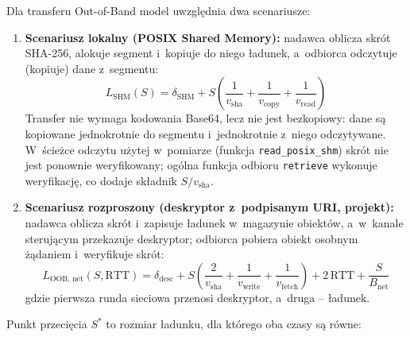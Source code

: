Dla transferu Out-of-Band model uwzględnia dwa scenariusze:
\begin{enumerate}
    \item \textbf{Scenariusz lokalny (POSIX Shared Memory):} nadawca oblicza skrót SHA-256, alokuje segment i~kopiuje do niego ładunek, a~odbiorca odczytuje (kopiuje) dane z~segmentu:
    \begin{equation}
    L_{\text{SHM}}(S) = \delta_{\text{SHM}} + S \left( \frac{1}{v_{\text{sha}}} + \frac{1}{v_{\text{copy}}} + \frac{1}{v_{\text{read}}} \right)
    \label{eq:latency_oob_shm}
    \end{equation}
    Transfer nie wymaga kodowania Base64, lecz nie jest bezkopiowy: dane są kopiowane jednokrotnie do segmentu i~jednokrotnie z~niego odczytywane. W~ścieżce odczytu użytej w~pomiarze (funkcja \texttt{read\_posix\_shm}) skrót nie jest ponownie weryfikowany; ogólna funkcja odbioru \texttt{retrieve} wykonuje weryfikację, co dodaje składnik $S / v_{\text{sha}}$.
    \item \textbf{Scenariusz rozproszony (deskryptor z~podpisanym URI, projekt):} nadawca oblicza skrót i~zapisuje ładunek w~magazynie obiektów, a~w~kanale sterującym przekazuje deskryptor; odbiorca pobiera obiekt osobnym żądaniem i~weryfikuje skrót:
    \begin{equation}
    L_{\text{OOB, net}}(S, \text{RTT}) = \delta_{\text{desc}} + S \left( \frac{2}{v_{\text{sha}}} + \frac{1}{v_{\text{write}}} + \frac{1}{v_{\text{fetch}}} \right) + 2\,\text{RTT} + \frac{S}{B_{\text{net}}}
    \label{eq:latency_oob_net}
    \end{equation}
    gdzie pierwsza runda sieciowa przenosi deskryptor, a~druga -- ładunek.
\end{enumerate}

Punkt przecięcia $S^*$ to rozmiar ładunku, dla którego oba czasy są równe:

